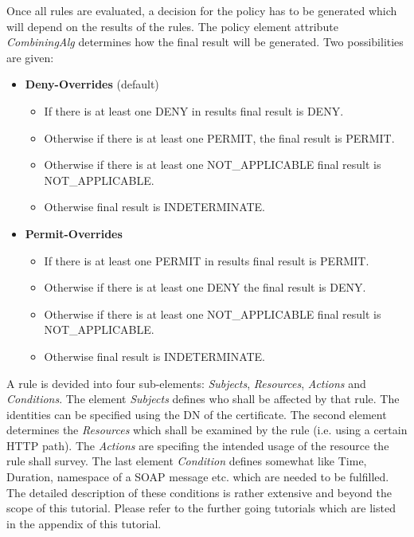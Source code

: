 Once all rules are evaluated, a decision for the policy has to be generated which will depend on the results of the rules.
The policy element attribute \textit{CombiningAlg} determines how the final result will be generated. Two possibilities are given:
\begin{itemize}
 \item \textbf{Deny-Overrides} (default) 
 \begin{itemize}
	\item If there is at least one DENY in results final result is DENY. 
	\item Otherwise if there is at least one PERMIT, the final result is PERMIT.
	\item Otherwise if there is at least one NOT\_APPLICABLE final result is NOT\_APPLICABLE.
	\item Otherwise final result is INDETERMINATE.
 \end{itemize}
  \item \textbf{Permit-Overrides}
 \begin{itemize}
 	\item If there is at least one PERMIT in results final result is PERMIT.
 	\item Otherwise if there is at least one DENY the final result is DENY.
 	\item Otherwise if there is at least one NOT\_APPLICABLE final result is NOT\_APPLICABLE.
 	\item Otherwise final result is INDETERMINATE.
 \end{itemize}
\end{itemize}
\forcelinebreak

A rule is devided into four sub-elements: \textit{Subjects}, \textit{Resources}, \textit{Actions} and \textit{Conditions}. 
The element \textit{Subjects} defines who shall be affected by that rule.
The identities can be specified using the DN of the certificate.
The second element determines the \textit{Resources} which shall be examined by the rule (i.e. using a certain HTTP path).
The \textit{Actions} are specifing the intended usage of the resource the rule shall survey.
The last element \textit{Condition} defines somewhat like Time, Duration, namespace of a SOAP message etc. which are needed to be fulfilled. The detailed description of these conditions is rather extensive and beyond the scope of this tutorial. Please refer to the further going tutorials which are listed in the appendix of this tutorial.\\


